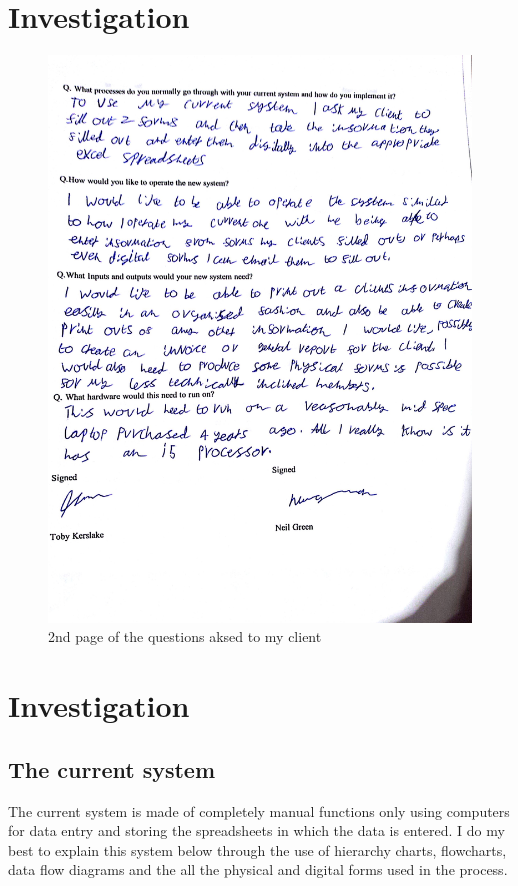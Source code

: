 \section{Investigation}

\begin{figure}[H]
    \includegraphics[width=\textwidth]{Questionaire 2.jpg}
    \caption{2nd page of the questions aksed to my client} \label{fig:2nd page of the questions aksed to my client}
\end{figure}
\section{Investigation}

\subsection{The current system}

The current system is made of completely manual functions only using computers for data entry and storing the spreadsheets in which the data is entered. I do my best to explain this system below through the use of hierarchy charts, flowcharts, data flow diagrams and the all the physical and digital forms used in the process.

